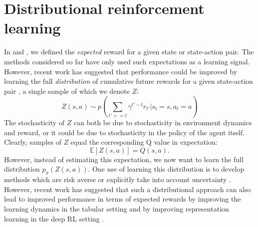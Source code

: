 \section*{Distributional reinforcement learning}
\label{sec:distributional}

In  and , we defined the \emph{expected} reward for a given state or state-action pair.
The methods considered so far have only used such expectations as a learning signal.
However, recent work has suggested that performance could be improved by learning the full \emph{distribution} of cumulative future rewards for a given state-action pair \citep{bellemare2017distributional, bellemare2023distributional,dabney2018distributional}, a single sample of which we denote $Z$:
\begin{equation}
    Z(s, a) \sim p \left ( \sum_{t' >= t} \gamma^{t' - t} r_{t'} | s_t = s, a_t = a \right )
\end{equation}
The stochasticity of $Z$ can both be due to stochasticity in environment dynamics and reward, or it could be due to stochasticity in the policy of the agent itself.
Clearly, samples of $Z$ equal the corresponding Q value in expectation:
\begin{equation}
    \mathbb{E} \left [ Z(s, a) \right ] = Q(s, a).
\end{equation}
However, instead of estimating this expectation, we now want to learn the full distribution $p_\pi(Z(s, a))$.
One use of learning this distribution is to develop methods which are risk averse \citep{morimura2010nonparametric,morimura2012parametric} or explicitly take into account uncertainty \citep{dearden1998bayesian}.
However, recent work has suggested that such a distributional approach can also lead to improved performance in terms of expected rewards by improving the learning dynamics in the tabular setting and by improving representation learning in the deep RL setting \citep{bellemare2017distributional,dabney2018distributional,rowland2019statistics,bellemare2023distributional}.

